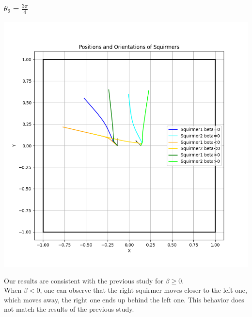 \documentclass{article}
\begin{document}
\subsubsection{$\theta_2 = \frac{3\pi}{4}$}
\begin{center}
   \includegraphics[width=1\textwidth]{graphs/simulations/twosquirmerinter/sq2.3pi.4.png}
\end{center}
Our results are consistent with the previous study for $\beta \ge 0$.\\
When $\beta < 0$, one can observe that the right squirmer moves closer to the left one, which moves away,
the right one ends up behind the left one. This behavior does not match the results of the previous study.\\
\end{document}
